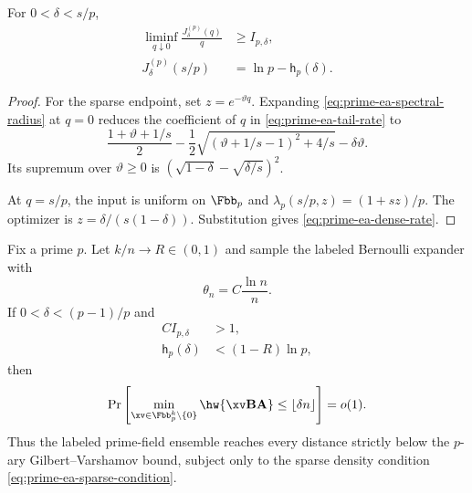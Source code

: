 \begin{lemma}
\label{lem:prime-ea-endpoints}
For $0<\delta<s/p$,
\begin{align}
 \liminf_{q\downarrow0}\frac{J^{(p)}_\delta(q)}q
 &\geq I_{p,\delta},
 \label{eq:prime-ea-sparse-limit}\\
 J^{(p)}_\delta(s/p)
 &=\ln p-\mathsf h_p(\delta).
 \label{eq:prime-ea-dense-rate}
\end{align}
\end{lemma}

\begin{proof}
For the sparse endpoint, set $z=e^{-\vartheta q}$.  Expanding
\eqref{eq:prime-ea-spectral-radius} at $q=0$ reduces the coefficient of $q$
in \eqref{eq:prime-ea-tail-rate} to
\[
 \frac{1+\vartheta+1/s}{2}
 -\frac12\sqrt{(\vartheta+1/s-1)^2+4/s}
 -\delta\vartheta.
\]
Its supremum over $\vartheta\geq0$ is
$(\sqrt{1-\delta}-\sqrt{\delta/s})^2$.

At $q=s/p$, the input is uniform on $\Fbb_p$ and
$\lambda_p(s/p,z)=(1+sz)/p$.  The optimizer is
$z=\delta/(s(1-\delta))$.  Substitution gives
\eqref{eq:prime-ea-dense-rate}.
\end{proof}

\begin{theorem}
\label{thm:prime-ea-linear-distance}
Fix a prime $p$.  Let $k/n\to R\in(0,1)$ and sample the labeled Bernoulli
expander with
\begin{equation}
 \theta_n=C\frac{\ln n}{n}.
 \label{eq:prime-ea-density}
\end{equation}
If $0<\delta<(p-1)/p$ and
\begin{align}
 C I_{p,\delta}&>1,
 \label{eq:prime-ea-sparse-condition}\\
 \mathsf h_p(\delta)&<(1-R)\ln p,
 \label{eq:prime-ea-gv-condition}
\end{align}
then
\begin{equation}
 \Pr\left[
  \min_{\xv\in\Fbb_p^k\setminus\{0\}}
  \hw{\xv\B\A}\leq\lfloor\delta n\rfloor
 \right]=o(1).
 \label{eq:prime-ea-linear-distance-conclusion}
\end{equation}
Thus the labeled prime-field ensemble reaches every distance strictly below
the $p$-ary Gilbert--Varshamov bound, subject only to the sparse density
condition \eqref{eq:prime-ea-sparse-condition}.
\end{theorem}

